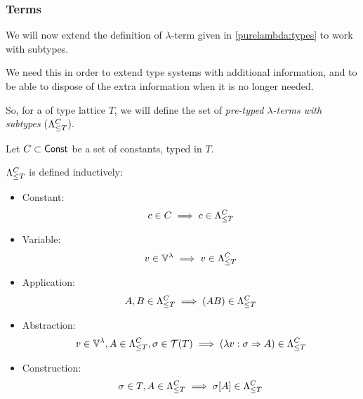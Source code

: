\documentclass[main.tex]{subfiles}
\begin{document}
\subsubsection{Terms}
We will now extend the definition of $\lambda$-term given in \cref{purelambda:types}
to work with subtypes.

We need this in order to extend type systems with additional information,
and to be able to dispose of the extra information when it is no longer needed.

So, for a of type lattice $T$, we will define the set of
\emph{pre-typed $\lambda$-terms with subtypes} ($\fancylambda{T}{C}$).

\begin{defn}
    Let $C \subset \const$ be a set of constants, typed in $T$.

    $\fancylambda{T}{C}$ is defined inductively:
    \begin{itemize}
        \item Constant:    \[ c \in C \implies c \in \fancylambda{T}{C} \]
        \item Variable:    \[ v \in \lvars \implies v \in \fancylambda{T}{C} \]
        \item Application: \[ A, B \in \fancylambda{T}{C} \implies (AB) \in \fancylambda{T}{C} \]
        \item Abstraction: \[ v \in \lvars, A \in \fancylambda{T}{C}, \sigma \in \tclos{T}
                \implies (\lambda v : \sigma \abstr A) \in \fancylambda{T}{C} \]
        \item Construction: \[ \sigma \in T, A \in \fancylambda{T}{C}
                \implies \sigma[A] \in \fancylambda{T}{C} \]
    \end{itemize}
\end{defn}
\end{document}

